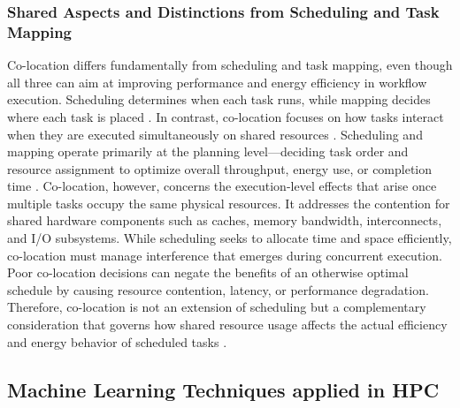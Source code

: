 \subsubsection{Shared Aspects and Distinctions from Scheduling and Task Mapping}
\label{sec:background_colocation_scheduling}
Co-location differs fundamentally from scheduling and task mapping, even though all three can aim at improving performance and energy efficiency in workflow execution. Scheduling determines when each task runs, while mapping decides where each task is placed \cite{9284517} \cite{Merkel_2010}. In contrast, co-location focuses on how tasks interact when they are executed simultaneously on shared resources \cite{9499521} \cite{9112926} \cite{Dauwe_2016}.
Scheduling and mapping operate primarily at the planning level—deciding task order and resource assignment to optimize overall throughput, energy use, or completion time \cite{Choudhary_2022}. Co-location, however, concerns the execution-level effects that arise once multiple tasks occupy the same physical resources. It addresses the contention for shared hardware components such as caches, memory bandwidth, interconnects, and I/O subsystems.
While scheduling seeks to allocate time and space efficiently, co-location must manage interference that emerges during concurrent execution. Poor co-location decisions can negate the benefits of an otherwise optimal schedule by causing resource contention, latency, or performance degradation. Therefore, co-location is not an extension of scheduling but a complementary consideration that governs how shared resource usage affects the actual efficiency and energy behavior of scheduled tasks \cite{5644899}.

\subsection{Machine Learning Techniques applied in HPC}
\label{sec:background_ml}


